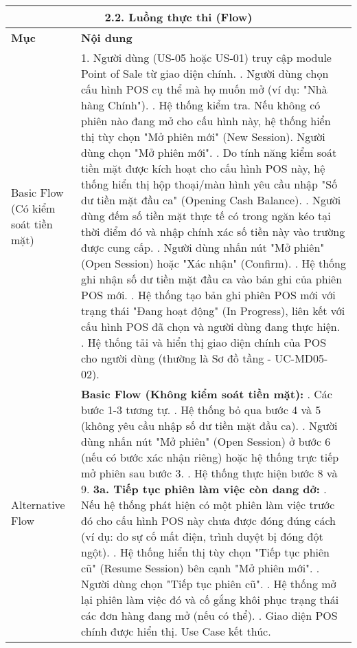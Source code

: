 \begin{longtable}{|m{4cm}|p{11cm}|}
\hline
\multicolumn{2}{|c|}{\textbf{2.2. Luồng thực thi (Flow)}} \\
\hline
\textbf{Mục} & \textbf{Nội dung} \\
\hline
Basic Flow (Có kiểm soát tiền mặt) & 1. Người dùng (US-05 hoặc US-01) truy cập module Point of Sale từ giao diện chính. \newline 2. Người dùng chọn cấu hình POS cụ thể mà họ muốn mở (ví dụ: "Nhà hàng Chính"). \newline 3. Hệ thống kiểm tra. Nếu không có phiên nào đang mở cho cấu hình này, hệ thống hiển thị tùy chọn "Mở phiên mới" (New Session). Người dùng chọn "Mở phiên mới". \newline 4. Do tính năng kiểm soát tiền mặt được kích hoạt cho cấu hình POS này, hệ thống hiển thị hộp thoại/màn hình yêu cầu nhập "Số dư tiền mặt đầu ca" (Opening Cash Balance). \newline 5. Người dùng đếm số tiền mặt thực tế có trong ngăn kéo tại thời điểm đó và nhập chính xác số tiền này vào trường được cung cấp. \newline 6. Người dùng nhấn nút "Mở phiên" (Open Session) hoặc "Xác nhận" (Confirm). \newline 7. Hệ thống ghi nhận số dư tiền mặt đầu ca vào bản ghi của phiên POS mới. \newline 8. Hệ thống tạo bản ghi phiên POS mới với trạng thái "Đang hoạt động" (In Progress), liên kết với cấu hình POS đã chọn và người dùng đang thực hiện. \newline 9. Hệ thống tải và hiển thị giao diện chính của POS cho người dùng (thường là Sơ đồ tầng - UC-MD05-02). \\
\hline
Alternative Flow & \textbf{Basic Flow (Không kiểm soát tiền mặt):} \newline    1. Các bước 1-3 tương tự. \newline    2. Hệ thống bỏ qua bước 4 và 5 (không yêu cầu nhập số dư tiền mặt đầu ca). \newline    3. Người dùng nhấn nút "Mở phiên" (Open Session) ở bước 6 (nếu có bước xác nhận riêng) hoặc hệ thống trực tiếp mở phiên sau bước 3. \newline    4. Hệ thống thực hiện bước 8 và 9. \newline \textbf{3a. Tiếp tục phiên làm việc còn dang dở:} \newline    1. Nếu hệ thống phát hiện có một phiên làm việc trước đó cho cấu hình POS này chưa được đóng đúng cách (ví dụ: do sự cố mất điện, trình duyệt bị đóng đột ngột). \newline    2. Hệ thống hiển thị tùy chọn "Tiếp tục phiên cũ" (Resume Session) bên cạnh "Mở phiên mới". \newline    3. Người dùng chọn "Tiếp tục phiên cũ". \newline    4. Hệ thống mở lại phiên làm việc đó và cố gắng khôi phục trạng thái các đơn hàng đang mở (nếu có thể). \newline    5. Giao diện POS chính được hiển thị. Use Case kết thúc. \\

\end{longtable}
